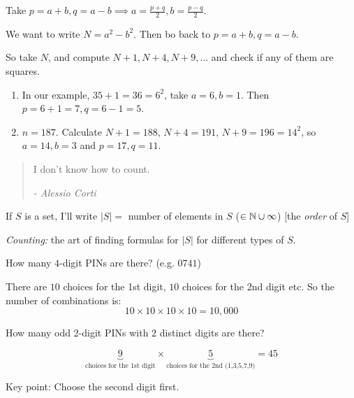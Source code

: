 \documentclass[10pt]{scrartcl}
\begin{document}
Take $p = a+b, q = a-b \implies a = \frac{p+q}{2}, b = \frac{p-q}{2}$. 

We want to write $N = a^2 - b^2$. Then bo back to $p= a + b, q = a-b$. 

So take $N$, and compute $N + 1, N+4,N+9,\dots$ and check if any of them are squares. \\

\begin{examples}
\begin{enumerate}
\item In our example, $35 + 1 = 36 = 6^2$, take $a = 6, b = 1$. Then	 $p = 6 + 1 =7 , q = 6-1 = 5$. 

\item $n = 187$. Calculate $N+1 = 188,\,N+4 = 191,\, N+9 = 196 = 14^2$, so $a = 14, b = 3$ and $p = 17, q =11$.
\end{enumerate} 
\end{examples}





\begin{quote}
I don't know how to count. \begin{flushright}
      \textit{ -  Alessio Corti}
       \end{flushright} 
\end{quote} \vspace*{5pt}


If  $S$ is a set, I'll write $|S| = $ number of elements in $S$ ($\in\mathbb{N} \cup \infty$) [the \emph{order} of $S$]

\emph{Counting:} the art of finding formulas for $|S|$ for different types of $S$.\\ 


\begin{example}
How many $4$-digit PINs are there? (e.g. $0741$)

There are $10$ choices for the 1st digit, $10$ choices for the 2nd digit etc. So the number of combinations is:
\[10 \times 10 \times 10 \times 10 = 10,000\]	
\end{example}\vspace*{5pt}

\begin{example}
How many odd $2$-digit PINs with $2$ distinct digits are there? 	

\[\underbrace{9}_{\text{choices for the 1st digit}} \times \underbrace{5}_{\text{choices for the 2nd (1,3,5,7,9)}} = 45\]

Key point: Choose the second digit first. 
\end{example}
\end{document}
